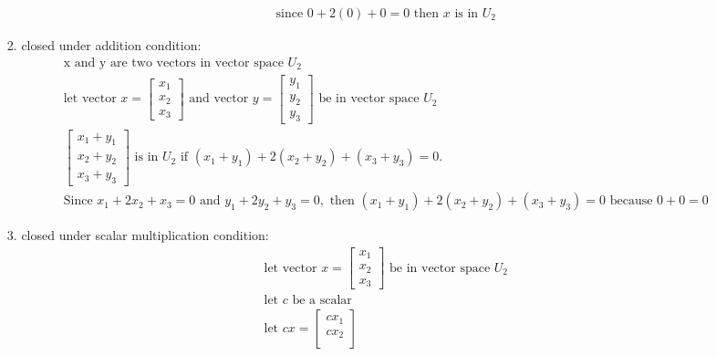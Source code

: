 \documentclass[11pt]{article}
\begin{document}
\begin{enumerate}
\begin{enumerate}
\begin{enumerate}
\[\begin{aligned}
            &\text{since } 0 + 2(0) + 0 = 0 \text{ then } x \text{ is in } U_2
        \end{aligned}
        \]
        \item closed under addition condition:
        \[
        \begin{aligned}
            &\text{x and y are two vectors in  vector space } U_2 \\
            &\text{let vector } x = \begin{bmatrix}
                x_1 \\
                x_2 \\
                x_3
            \end{bmatrix} \text{ and vector } y = \begin{bmatrix}
                y_1 \\
                y_2 \\
                y_3
            \end{bmatrix} \text{ be in vector space } U_2 \\
            &\begin{bmatrix}
                x_1 + y_1 \\
                x_2 + y_2 \\
                x_3 + y_3
            \end{bmatrix} \text{ is in } U_2  \text{ if } (x_1 + y_1) + 2(x_2 + y_2) + (x_3 + y_3) = 0.\\ 
            &\text{Since } x_1 + 2x_2 + x_3 = 0 \text{ and } y_1 + 2y_2 + y_3 = 0, \text{ then } (x_1 + y_1) + 2(x_2 + y_2) + (x_3 + y_3) = 0 \text{ because } 0 + 0  = 0
        \end{aligned}
        \]
        \item closed under scalar multiplication condition:
        \[
        \begin{aligned}
            &\text{let vector } x = \begin{bmatrix}
                x_1 \\
                x_2 \\
                x_3
            \end{bmatrix} \text{ be in vector space } U_2 \\
            &\text{let } c \text{ be a scalar} \\
            &\text{let } cx = \begin{bmatrix}
                cx_1 \\
                cx_2 \\

\end{bmatrix}
\end{aligned}\]
\end{enumerate}
\end{enumerate}
\end{enumerate}
\end{document}
